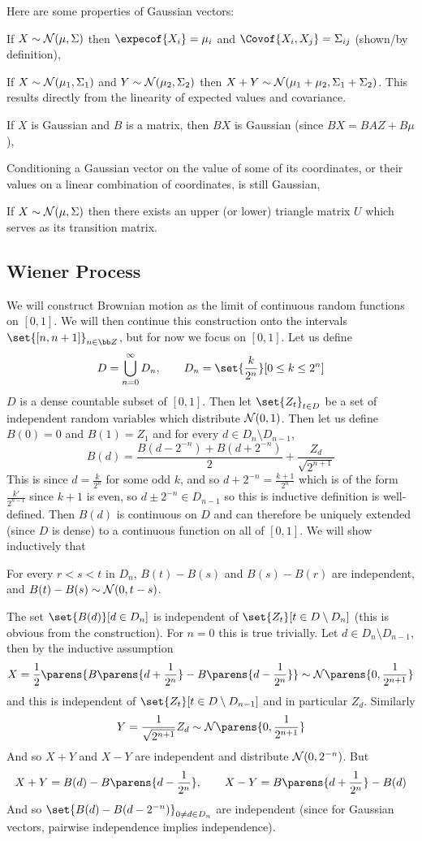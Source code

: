 Here are some properties of Gaussian vectors:
\benum
    \item If $X\sim{\cal N}(\mu,\Sigma)$ then $\expecof{X_i}=\mu_i$ and $\Covof{X_i,X_j}=\Sigma_{ij}$ (shown/by definition),
    \item If $X\sim{\cal N}(\mu_1,\Sigma_1)$ and $Y\sim{\cal N}(\mu_2,\Sigma_2)$ then $X+Y\sim{\cal N}(\mu_1+\mu_2,\Sigma_1+\Sigma_2)$.
        This results directly from the linearity of expected values and covariance.
    \item If $X$ is Gaussian and $B$ is a matrix, then $BX$ is Gaussian (since $BX=BAZ+B\mu$),
    \item Conditioning a Gaussian vector on the value of some of its coordinates, or their values on a linear combination of coordinates, is still Gaussian,
    \item If $X\sim{\cal N}(\mu,\Sigma)$ then there exists an upper (or lower) triangle matrix $U$ which serves as its transition matrix.
\eenum

\subsection{Wiener Process}

We will construct Brownian motion as the limit of continuous random functions on $[0,1]$.
We will then continue this construction onto the intervals $\set{[n,n+1]}_{n\in{\bb Z}}$, but for now we focus on $[0,1]$.
Let us define
$$ D = \bigcup_{n=0}^\infty D_n,\qquad D_n = \set{\frac k{2^n}}[0\leq k\leq 2^n] $$
$D$ is a dense countable subset of $[0,1]$.
Then let $\set{Z_t}_{t\in D}$ be a set of independent random variables which distribute ${\cal N}(0,1)$.
Then let us define $B(0)=0$ and $B(1)=Z_1$ and for every $d\in D_n\setminus D_{n-1}$,
$$ B(d) = \frac{B(d-2^{-n}) + B(d+2^{-n})}2 + \frac{Z_d}{\sqrt{2^{n+1}}} $$
This is since $d=\frac k{2^n}$ for some odd $k$, and so $d+2^{-n}=\frac{k+1}{2^n}$ which is of the form $\frac{k'}{2^{n-1}}$ since $k+1$ is even, so $d\pm2^{-n}\in D_{n-1}$ so this is inductive definition
is well-defined.
Then $B(d)$ is continuous on $D$ and can therefore be uniquely extended (since $D$ is dense) to a continuous function on all of $[0,1]$.
We will show inductively that
\benum
    \item For every $r<s<t$ in $D_n$, $B(t)-B(s)$ and $B(s)-B(r)$ are independent, and $B(t)-B(s)\sim{\cal N}(0,t-s)$.
    \item The set $\set{B(d)}[d\in D_n]$ is independent of $\set{Z_t}[t\in D\setminus D_n]$ (this is obvious from the construction).
\eenum
For $n=0$ this is true trivially.
Let $d\in D_n\setminus D_{n-1}$, then by the inductive assumption
$$ X = \frac12\parens{B\parens{d+\frac1{2^n}}-B\parens{d-\frac1{2^n}}}\sim{\cal N}\parens{0,\frac1{2^{n+1}}} $$
and this is independent of $\set{Z_t}[t\in D\setminus D_{n-1}]$ and in particular $Z_d$.
Similarly
$$ Y = \frac1{\sqrt{2^{n+1}}}Z_d \sim {\cal N}\parens{0,\frac1{2^{n+1}}} $$
And so $X+Y$ and $X-Y$ are independent and distribute ${\cal N}(0,2^{-n})$.
But
$$ X + Y = B(d) - B\parens{d-\frac1{2^n}},\qquad X - Y = B\parens{d+\frac1{2^n}} - B(d) $$
And so $\set{B(d)-B(d-2^{-n})}_{0\neq d\in D_n}$ are independent (since for Gaussian vectors, pairwise independence implies independence).

